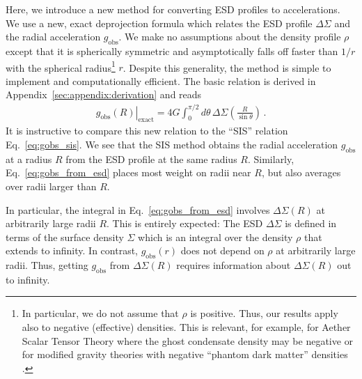 \documentclass[a4paper,11pt]{article}
\begin{document}
Here, we introduce a new method for converting ESD profiles to accelerations.
We use a new, exact deprojection formula which relates the ESD profile $\Delta \Sigma$ and the radial acceleration $g_{\mathrm{obs}}$.
We make no assumptions about the density profile $\rho$ except that it is spherically symmetric and asymptotically falls off faster than $1/r$ with the spherical radius\footnote{
  In particular, we do not assume that $\rho$ is positive.
  Thus, our results apply also to negative (effective) densities.
  This is relevant, for example, for Aether Scalar Tensor Theory \citep{Skordis2020} where the ghost condensate density may be negative \citep{Mistele2023} or for modified gravity theories with negative ``phantom dark matter'' densities \citep{Milgrom1986b}.
} $r$.
Despite this generality, the method is simple to implement and computationally efficient.
The basic relation is derived in Appendix~\ref{sec:appendix:derivation} and reads
\begin{align}
 \label{eq:gobs_from_esd}
 \left.g_{\mathrm{obs}}(R)\right|_{\mathrm{exact}} = 4G \int_0^{\pi/2} d\theta \, \Delta \Sigma\left(\frac{R}{\sin \theta}\right) \,.
\end{align}
It is instructive to compare this new relation to the ``SIS'' relation Eq.~\eqref{eq:gobs_sis}.
We see that the SIS method obtains the radial acceleration $g_{\mathrm{obs}}$ at a radius $R$ from the ESD profile at the same radius $R$.
Similarly, Eq.~\eqref{eq:gobs_from_esd} places most weight on radii near $R$, but also averages over radii larger than $R$.

In particular, the integral in Eq.~\eqref{eq:gobs_from_esd} involves $\Delta \Sigma(R)$ at arbitrarily large radii $R$.
This is entirely expected:
The ESD $\Delta \Sigma$ is defined in terms of the surface density $\Sigma$ which is an integral over the density $\rho$ that extends to infinity.
In contrast, $g_{\mathrm{obs}}(r)$ does not depend on $\rho$ at arbitrarily large radii.
Thus, getting $g_{\mathrm{obs}}$ from $\Delta \Sigma(R)$ requires information about $\Delta \Sigma(R)$ out to infinity.
\end{document}
